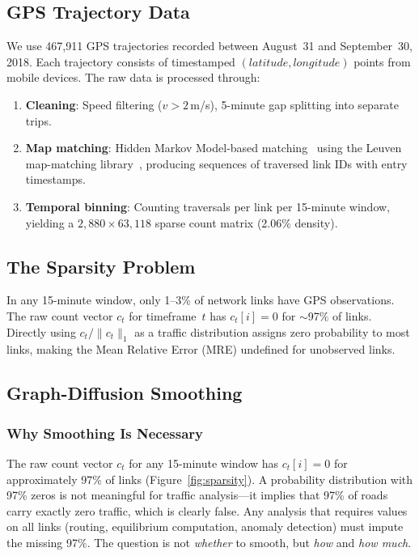 \documentclass[11pt]{article}
\begin{document}
\subsection{GPS Trajectory Data}

We use 467,911 GPS trajectories recorded between August~31 and September~30, 2018.
Each trajectory consists of timestamped $(latitude, longitude)$ points from mobile devices.
The raw data is processed through:
\begin{enumerate}
    \item \textbf{Cleaning}: Speed filtering ($v > 2$\,m/s), 5-minute gap splitting into separate trips.
    \item \textbf{Map matching}: Hidden Markov Model-based matching~\cite{newson2009hidden} using the Leuven map-matching library~\cite{meert2018hmm}, producing sequences of traversed link IDs with entry timestamps.
    \item \textbf{Temporal binning}: Counting traversals per link per 15-minute window, yielding a $2{,}880 \times 63{,}118$ sparse count matrix (2.06\% density).
\end{enumerate}

\subsection{The Sparsity Problem}
\label{sec:sparsity}

In any 15-minute window, only 1--3\% of network links have GPS observations.
The raw count vector $c_t$ for timeframe~$t$ has $c_t[i] = 0$ for $\sim$97\% of links.
Directly using $c_t / \|c_t\|_1$ as a traffic distribution assigns zero probability to most links, making the Mean Relative Error (MRE) undefined for unobserved links.

\subsection{Graph-Diffusion Smoothing}
\label{sec:smoothing}

\subsubsection{Why Smoothing Is Necessary}

The raw count vector $c_t$ for any 15-minute window has $c_t[i] = 0$ for approximately 97\% of links (Figure~\ref{fig:sparsity}).
A probability distribution with 97\% zeros is not meaningful for traffic analysis---it implies that 97\% of roads carry exactly zero traffic, which is clearly false.
Any analysis that requires values on all links (routing, equilibrium computation, anomaly detection) must impute the missing 97\%.
The question is not \emph{whether} to smooth, but \emph{how} and \emph{how much}.
\end{document}
